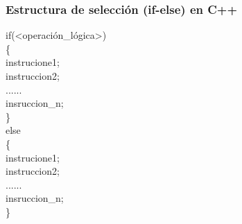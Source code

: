 \documentclass[a4paper,12pt,spanish]{article}
\begin{document}
\newpage
\restoregeometry

\subsubsection{Estructura de selección (if-else) en C++}
\label{sec:estr-de-selecc}



    \begin{tcolorbox}[title=''Sintaxis estructura if'']
      if(<operación\_lógica>)\\
      \{\\
        instrucione1;\\
        instruccion2;\\
        ......\\
        insruccion\_n;\\
        \}\\
        else\\
        \{\\
        instrucione1;\\
        instruccion2;\\
        ......\\
        insruccion\_n;\\
        \}\\
    \end{tcolorbox}
\end{document}
